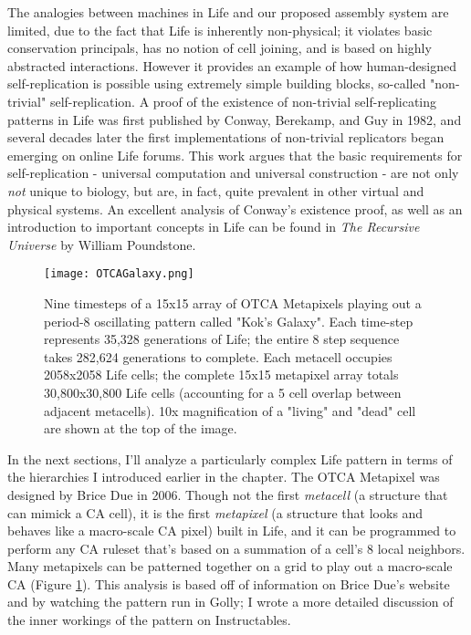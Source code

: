 {The analogies between machines in Life and our proposed assembly system are limited, due to the fact that Life is inherently non-physical; it violates basic conservation principals, has no notion of cell joining, and is based on highly abstracted interactions.  However it provides an example of how human-designed self-replication is possible using extremely simple building blocks, so-called "non-trivial" self-replication.  A proof of the existence of non-trivial self-replicating patterns in Life was first published by Conway, Berekamp, and Guy in 1982\cite{Berekamp1982}, and several decades later the first implementations of non-trivial replicators began emerging on online Life forums\cite{Greene2013a}.  This work argues that the basic requirements for self-replication - universal computation and universal construction - are not only \textit{not} unique to biology, but are, in fact, quite prevalent in other virtual and physical systems.  An excellent analysis of Conway's existence proof, as well as an introduction to important concepts in Life can be found in \textit{The Recursive Universe} by William Poundstone\cite{Poundstone1985}.\\

\begin{figure}
  \texttt{[image: OTCAGalaxy.png]}
  \caption{Nine timesteps of a 15x15 array of OTCA Metapixels playing out a period-8 oscillating pattern called "Kok's Galaxy".  Each time-step represents 35,328 generations of Life; the entire 8 step sequence takes 282,624 generations to complete.  Each metacell occupies 2058x2058 Life cells; the complete 15x15 metapixel array totals 30,800x30,800 Life cells (accounting for a 5 cell overlap between adjacent metacells).  10x magnification of a "living" and "dead" cell are shown at the top of the image.}
  \label{fig:OTCAGalaxy}
\end{figure}

In the next sections, I'll analyze a particularly complex Life pattern in terms of the hierarchies I introduced earlier in the chapter.  The OTCA Metapixel was designed by Brice Due in 2006.  Though not the first \textit{metacell} (a structure that can mimick a CA cell), it is the first \textit{metapixel} (a structure that looks and behaves like a macro-scale CA pixel) built in Life, and it can be programmed to perform any CA ruleset that's based on a summation of a cell's 8 local neighbors.  Many metapixels can be patterned together on a grid to play out a macro-scale CA (Figure \ref{fig:OTCAGalaxy}).  This analysis is based off of information on Brice Due's website\cite{Due2006} and by watching the pattern run in Golly; I wrote a more detailed discussion of the inner workings of the pattern on Instructables\cite{Ghassaei2015}.

}
